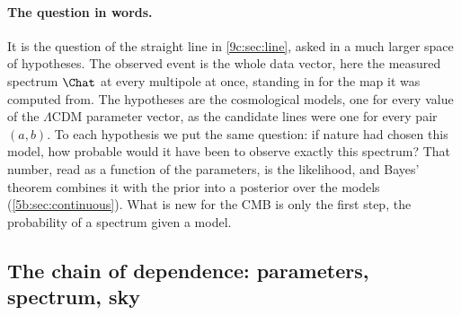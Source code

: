 \paragraph{The question in words.} It is the question of the straight line in
\cref{9c:sec:line}, asked in a much larger space of hypotheses. The observed event is the whole data
vector, here the measured spectrum $\Chat$ at every multipole at once, standing in for the map it was
computed from. The hypotheses are the cosmological models, one for every value of the $\Lambda$CDM
parameter vector, as the candidate lines were one for every pair $(a,b)$. To each hypothesis we put the
same question: if nature had chosen this model, how probable would it have been to observe exactly this
spectrum? That number, read as a function of the parameters, is the likelihood, and Bayes' theorem combines
it with the prior into a posterior over the models (\cref{5b:sec:continuous}). What is new for the CMB is
only the first step, the probability of a spectrum given a model.

\subsection{The chain of dependence: parameters, spectrum, sky}
\label{9c:sec:cl-hier}

